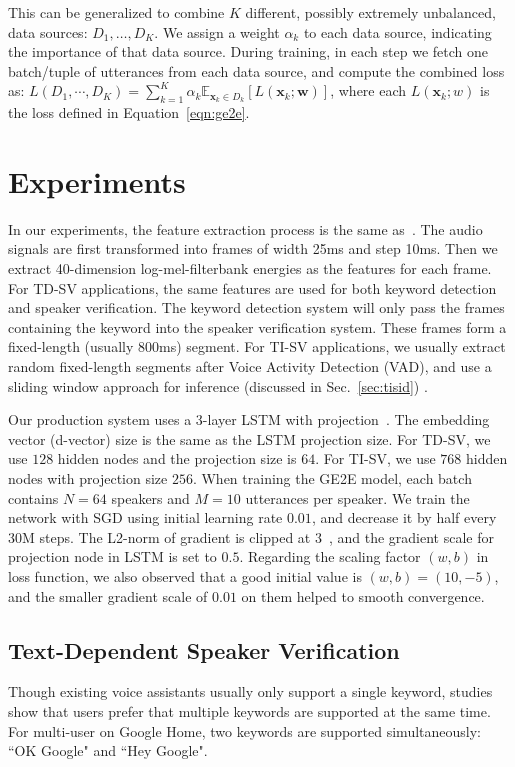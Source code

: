 \documentclass{article}
\newcommand{\vx}{\mathbf{x}}
\newcommand{\vw}{\mathbf{w}}
\newcommand{\E}{\mathbb{E}}
\begin{document}
This can be generalized to combine $K$ different, possibly extremely unbalanced,
data sources: $D_1,\dots, D_K$. We assign a weight $\alpha_k$ to each data
source, indicating the importance of that data source.
During training, in each step we fetch one batch/tuple of
utterances from each data source, and compute the combined loss as:
$L(D_1,\cdots, D_K)=\sum_{k=1}^K \alpha_k \E_{\vx_k\in D_k}[L(\vx_k;\vw)]$,
where each $L(\vx_k;w)$ is the loss defined in Equation~\ref{eqn:ge2e}.


\section{Experiments}
\label{sec:exp}

In our experiments, the feature extraction process is the same as~\cite{prabhavalkar2015automatic}.
The audio signals are first transformed into frames of width 25ms and step 10ms.
Then we extract 40-dimension log-mel-filterbank energies as the features for
each frame. For TD-SV applications, the same features are used for both keyword
detection and speaker verification. The keyword detection system will only pass
the frames containing the keyword into the speaker verification system. These
frames form a fixed-length (usually 800ms) segment. For TI-SV applications, we
usually extract random fixed-length segments after Voice Activity Detection
(VAD), and use a sliding window approach for inference (discussed in Sec.~\ref{sec:tisid}) .

Our production system uses a 3-layer LSTM with projection~\cite{sak2014long}. The embedding vector
(d-vector) size is the same as the LSTM projection size. For TD-SV, we use $128$
hidden nodes and the projection size is $64$. For TI-SV, we use $768$ hidden
nodes with projection size $256$. When training the GE2E model, each batch contains $N=64$
speakers and $M=10$ utterances per speaker.
We train the network with SGD using initial learning rate $0.01$, and decrease it by half every 30M steps.
The L2-norm of gradient is clipped at $3$~\cite{Pascanu2012}, and the gradient scale for projection
node in LSTM is set to $0.5$. Regarding the scaling factor $(w,b)$ in loss function,
we also observed that a good initial value is $(w,b)=(10,-5)$, and
the smaller gradient scale of $0.01$ on them helped to smooth convergence.

\subsection{Text-Dependent Speaker Verification}
\label{sec:tdsid}
Though existing voice assistants usually only support a single keyword,
studies show that users prefer
that multiple keywords are supported at the same time. For multi-user on Google
Home, two keywords are supported simultaneously: ``OK Google" and ``Hey Google".
\end{document}
